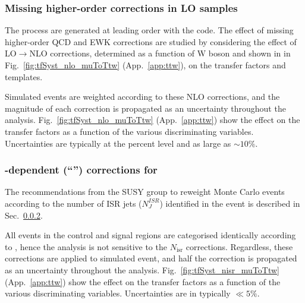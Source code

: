\subsubsection{Missing higher-order corrections in LO \texorpdfstring{\MADGRAPH}{MadGraph}
  samples}
\label{sec:nlo}

The \wj process are generated at leading order with the \MADGRAPH
code. The effect of missing higher-order QCD and EWK corrections are
studied by considering the effect of LO$\rightarrow$NLO corrections,
determined as a function of W boson \Pt and shown in in
Fig.~\ref{fig:tfSyst_nlo_muToTtw} (App.~\ref{app:ttw}), on the
transfer factors and \HTmiss templates. 

Simulated \wj events are weighted according to these NLO corrections,
and the magnitude of each correction is propagated as an uncertainty
throughout the analysis. Fig.~\ref{fig:tfSyst_nlo_muToTtw}
(App.~\ref{app:ttw}) show the effect on the transfer factors as a
function of the various discriminating variables. Uncertainties are
typically at the percent level and as large as $\sim 10\%$.


\subsubsection{\texorpdfstring{\njet}{Njet}-dependent (``\texorpdfstring{\nisr}{Nisr}'') corrections for \texorpdfstring{\ttbar}{TTbar}}
\label{sec:nisr}

The recommendations from the SUSY group to reweight \MADGRAPH \ttbar
Monte Carlo events according to the number of ISR jets ($N_J^{ISR}$)
identified in the event is described in
Sec.~\ref{sec:nisr}. 

All events in the control and signal regions are categorised
identically according to \njet, hence the analysis is not sensitive to
the $N_\textrm{isr}$ corrections. Regardless, these corrections are
applied to simulated \ttbar event, and half the correction is
propagated as an uncertainty throughout the
analysis. Fig.~\ref{fig:tfSyst_nisr_muToTtw} (App.~\ref{app:ttw}) show
the effect on the transfer factors as a function of the various
discriminating variables. Uncertainties are in typically $\ll 5\%$.


